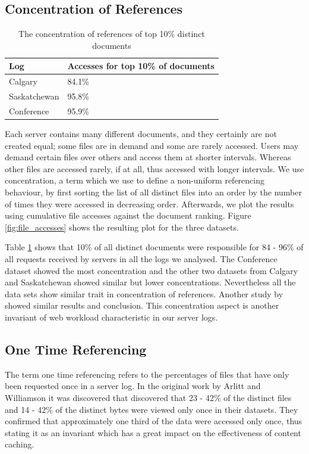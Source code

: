 \documentclass[10pt,conference]{IEEEtran}
\begin{document}
\subsection{Concentration of References} %
\label{sub:concentration_of_references}
\begin{table}[h]
    \caption{The concentration of references of top 10\% distinct documents}\label{tab:conc_references}
    \begin{tabular}{l | l}
        Log & Accesses for top 10\% of documents\\
        \hline
        Calgary & 84.1\%\\
        Saskatchewan & 95.8\%\\
        Conference & 95.9\%
    \end{tabular}
\end{table}
Each server contains many different documents, and they certainly are not created equal; some files are in demand and some are rarely accessed. Users may demand certain files over others and access them at shorter intervals. Whereas other files are accessed rarely, if at all, thus accessed with longer intervals. We use concentration, a term which we use to define a non-uniform referencing behaviour, by first sorting the list of all distinct files into an order by the number of times they were accessed in decreasing order. Afterwards, we plot the results using cumulative file accesses against the document ranking. Figure \ref{fig:file_accesses} shows the resulting plot for the three datasets.

Table \ref{tab:conc_references} shows that 10\% of all distinct documents were responsible for 84 - 96\% of all requests received by servers in all the logs we analysed. The Conference dataset showed the most concentration and the other two datasets from Calgary and Saskatchewan showed similar but lower concentrations. Nevertheless all the data sets show similar trait in concentration of references. Another study by \cite{Mahanti} showed similar results and conclusion. This concentration aspect is another invariant of web workload characteristic in our server logs.

\subsection{One Time Referencing} %
\label{sub:one_time_referencing}
The term one time referencing refers to the percentages of files that have only been requested once in a server log. In the original work by Arlitt and Williamson \cite{invariants} it was discovered that discovered that 23 - 42\% of the distinct files and 14 - 42\% of the distinct bytes were viewed only once in their datasets. They confirmed that approximately one third of the data were accessed only once, thus stating it as an invariant which has a great impact on the effectiveness of content caching.
\end{document}
